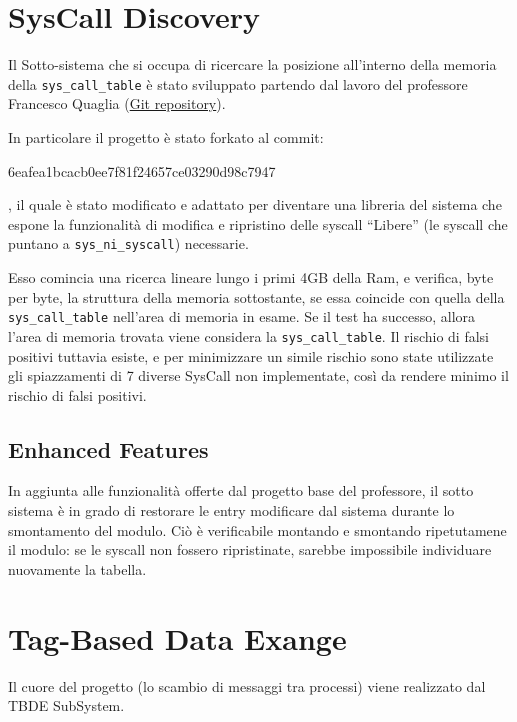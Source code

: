 \section{SysCall Discovery} \label{SysCallDiscovery}

Il Sotto-sistema che si occupa di ricercare la posizione all'interno della memoria della \verb|sys_call_table| è stato
sviluppato partendo dal lavoro del professore Francesco Quaglia
(\href{https://github.com/FrancescoQuaglia/Linux-sys_call_table-discoverer}{Git repository}).

In particolare il progetto è stato forkato al commit:
\begin{verb}6eafea1bcacb0ee7f81f24657ce03290d98c7947\end{verb}, il quale è stato modificato e
adattato per diventare una libreria del sistema che espone la funzionalità di modifica e ripristino delle syscall
``Libere'' (le syscall che puntano a \verb|sys_ni_syscall|) necessarie.

Esso comincia una ricerca lineare lungo i primi 4GB della Ram, e verifica, byte per byte, la struttura della memoria
sottostante, se essa coincide con quella della \verb|sys_call_table| nell'area di memoria in esame.
Se il test ha successo, allora l'area di memoria trovata viene considera la \verb|sys_call_table|.
Il rischio di falsi positivi tuttavia esiste, e per minimizzare un simile rischio sono state utilizzate gli
spiazzamenti di 7 diverse SysCall non implementate, così da rendere minimo il rischio di falsi positivi.

\subsection{Enhanced Features} \label{SysCallDiscovery_EnhancedFeatures}
In aggiunta alle funzionalità offerte dal progetto base del professore, il sotto sistema è in grado di restorare le
entry modificare dal sistema durante lo smontamento del modulo.
Ciò è verificabile montando e smontando ripetutamene il modulo: se le syscall non fossero ripristinate, sarebbe
impossibile individuare nuovamente la tabella.
\newpage


\section{Tag-Based Data Exange} \label{tbde}

Il cuore del progetto (lo scambio di messaggi tra processi) viene realizzato dal TBDE SubSystem.

